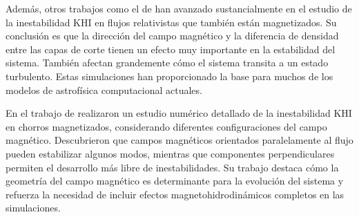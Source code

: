 Además, otros trabajos como el de \cite{mizuno-2013} han avanzado sustancialmente en el estudio de la inestabilidad KHI en flujos relativistas que también están magnetizados. Su conclusión es que la dirección del campo magnético y la diferencia de densidad entre las capas de corte tienen un efecto muy importante en la estabilidad del sistema. También afectan grandemente cómo el sistema transita a un estado turbulento. Estas simulaciones han proporcionado la base para muchos de los modelos de astrofísica computacional actuales.

En el trabajo de \cite{bucciantini-2006} realizaron un estudio numérico detallado de la inestabilidad KHI en chorros magnetizados, considerando diferentes configuraciones del campo magnético. Descubrieron que campos magnéticos orientados paralelamente al flujo pueden estabilizar algunos modos, mientras que componentes perpendiculares permiten el desarrollo más libre de inestabilidades. Su trabajo destaca cómo la geometría del campo magnético es determinante para la evolución del sistema y refuerza la necesidad de incluir efectos magnetohidrodinámicos completos en las simulaciones.
